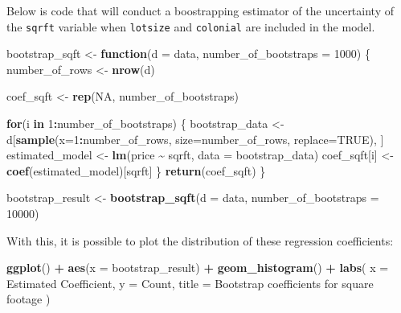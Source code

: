 \documentclass[
]{book}
\newenvironment{Shaded}{\begin{snugshade}}{\end{snugshade}}
\newcommand{\AttributeTok}[1]{\textcolor[rgb]{0.13,0.29,0.53}{#1}}
\newcommand{\ConstantTok}[1]{\textcolor[rgb]{0.56,0.35,0.01}{#1}}
\newcommand{\ControlFlowTok}[1]{\textcolor[rgb]{0.13,0.29,0.53}{\textbf{#1}}}
\newcommand{\DecValTok}[1]{\textcolor[rgb]{0.00,0.00,0.81}{#1}}
\newcommand{\FunctionTok}[1]{\textcolor[rgb]{0.13,0.29,0.53}{\textbf{#1}}}
\newcommand{\NormalTok}[1]{#1}
\newcommand{\OtherTok}[1]{\textcolor[rgb]{0.56,0.35,0.01}{#1}}
\newcommand{\SpecialCharTok}[1]{\textcolor[rgb]{0.81,0.36,0.00}{\textbf{#1}}}
\newcommand{\StringTok}[1]{\textcolor[rgb]{0.31,0.60,0.02}{#1}}
\theoremstyle{definition}
\theoremstyle{definition}
\theoremstyle{definition}
\theoremstyle{definition}
\theoremstyle{remark}
\begin{document}
Below is code that will conduct a boostrapping estimator of the uncertainty of the \texttt{sqrft} variable when \texttt{lotsize} and \texttt{colonial} are included in the model.

\begin{Shaded}
\begin{Highlighting}[]
\NormalTok{bootstrap\_sqft }\OtherTok{\textless{}{-}} \ControlFlowTok{function}\NormalTok{(}\AttributeTok{d =}\NormalTok{ data, }\AttributeTok{number\_of\_bootstraps =} \DecValTok{1000}\NormalTok{) \{ }
\NormalTok{  number\_of\_rows }\OtherTok{\textless{}{-}} \FunctionTok{nrow}\NormalTok{(d)}

\NormalTok{    coef\_sqft }\OtherTok{\textless{}{-}} \FunctionTok{rep}\NormalTok{(}\ConstantTok{NA}\NormalTok{, number\_of\_bootstraps)}

    \ControlFlowTok{for}\NormalTok{(i }\ControlFlowTok{in} \DecValTok{1}\SpecialCharTok{:}\NormalTok{number\_of\_bootstraps) \{ }
\NormalTok{      bootstrap\_data }\OtherTok{\textless{}{-}}\NormalTok{ d[}\FunctionTok{sample}\NormalTok{(}\AttributeTok{x=}\DecValTok{1}\SpecialCharTok{:}\NormalTok{number\_of\_rows, }\AttributeTok{size=}\NormalTok{number\_of\_rows, }\AttributeTok{replace=}\ConstantTok{TRUE}\NormalTok{), ]  }
\NormalTok{      estimated\_model }\OtherTok{\textless{}{-}} \FunctionTok{lm}\NormalTok{(price }\SpecialCharTok{\textasciitilde{}}\NormalTok{ sqrft, }\AttributeTok{data =}\NormalTok{ bootstrap\_data)}
\NormalTok{      coef\_sqft[i]    }\OtherTok{\textless{}{-}} \FunctionTok{coef}\NormalTok{(estimated\_model)[}\StringTok{\textquotesingle{}sqrft\textquotesingle{}}\NormalTok{]}
\NormalTok{    \}}
  \FunctionTok{return}\NormalTok{(coef\_sqft)}
\NormalTok{\}}
\end{Highlighting}
\end{Shaded}

\begin{Shaded}
\begin{Highlighting}[]
\NormalTok{bootstrap\_result }\OtherTok{\textless{}{-}} \FunctionTok{bootstrap\_sqft}\NormalTok{(}\AttributeTok{d =}\NormalTok{ data, }\AttributeTok{number\_of\_bootstraps =} \DecValTok{10000}\NormalTok{)}
\end{Highlighting}
\end{Shaded}

With this, it is possible to plot the distribution of these regression coefficients:

\begin{Shaded}
\begin{Highlighting}[]
\FunctionTok{ggplot}\NormalTok{() }\SpecialCharTok{+} 
  \FunctionTok{aes}\NormalTok{(}\AttributeTok{x =}\NormalTok{ bootstrap\_result) }\SpecialCharTok{+} 
  \FunctionTok{geom\_histogram}\NormalTok{() }\SpecialCharTok{+} 
  \FunctionTok{labs}\NormalTok{(}
    \AttributeTok{x =} \StringTok{\textquotesingle{}Estimated Coefficient\textquotesingle{}}\NormalTok{, }
    \AttributeTok{y =} \StringTok{\textquotesingle{}Count\textquotesingle{}}\NormalTok{, }
    \AttributeTok{title =} \StringTok{\textquotesingle{}Bootstrap coefficients for square footage\textquotesingle{}}
\NormalTok{  )}
\end{Highlighting}
\end{Shaded}
\end{document}
